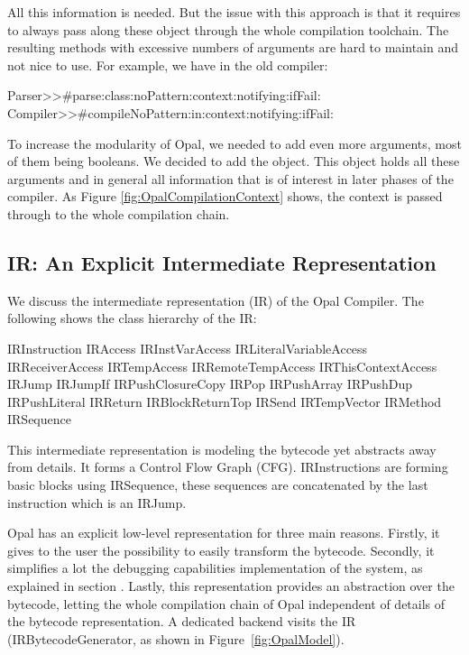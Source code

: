 \documentclass[preprint,10pt]{sigplanconf}
\begin{document}
All this information is needed. But the issue with this approach is that it requires to always pass along these object through the whole compilation toolchain.
 The resulting methods with excessive numbers of arguments are hard to maintain and not nice to use. For example, we have in the old compiler:
\begin{code}{}
Parser>>#parse:class:noPattern:context:notifying:ifFail:
Compiler>>#compileNoPattern:in:context:notifying:ifFail:
\end{code}

To increase the modularity of Opal, we needed to add even more arguments, most of them being booleans. We decided to add the  object. This object holds all these arguments and in general all information that is of interest in later
phases of the compiler. As Figure \ref{fig:OpalCompilationContext} shows, the context is passed through to the whole compilation chain.

\subsection{IR: An Explicit Intermediate Representation}
We discuss the intermediate representation  (IR) of the Opal Compiler. The following shows the class hierarchy of the IR:

\begin{code}{}
IRInstruction
        IRAccess
                IRInstVarAccess
                IRLiteralVariableAccess
                IRReceiverAccess
                IRTempAccess
                        IRRemoteTempAccess
                IRThisContextAccess
        IRJump
                IRJumpIf
                IRPushClosureCopy
        IRPop
        IRPushArray
        IRPushDup
        IRPushLiteral
        IRReturn
                IRBlockReturnTop
        IRSend
        IRTempVector
IRMethod
IRSequence
\end{code}

This intermediate representation is modeling the bytecode yet abstracts away from details. It forms a Control Flow Graph (CFG). IRInstructions are forming basic blocks using IRSequence, these sequences are concatenated by the last instruction which is an IRJump.


Opal has an explicit low-level representation for three main reasons.
Firstly, it gives to the user the possibility to easily transform the bytecode. 
Secondly, it simplifies a lot the debugging capabilities implementation of the system, as explained in section .
Lastly, this representation provides an abstraction over the bytecode, letting the whole compilation chain of Opal independent of details of the bytecode representation. A dedicated backend visits the IR (IRBytecodeGenerator, as shown in Figure~\ref{fig:OpalModel}).
\end{document}
